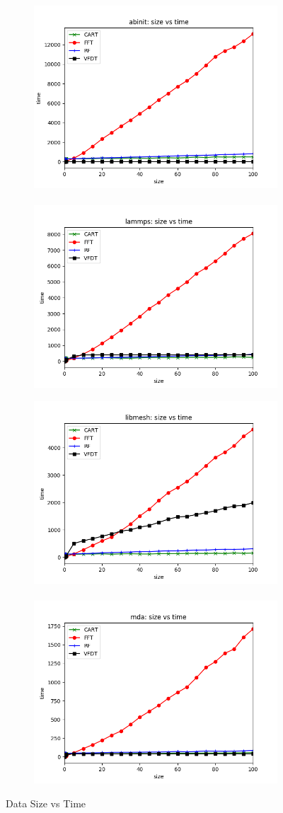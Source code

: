 \documentclass[sigplan]{acmart}\settopmatter{printfolios=true,printccs=false,printacmref=false}
\begin{document}
\begin{figure}
	\centering
	\begin{subfigure}[b]{\linewidth}
		\includegraphics[width=.49\linewidth]{fig/abinit-size-time.png} \ 
		\includegraphics[width=.49\linewidth]{fig/lammps-size-time.png}
	\end{subfigure}
	\begin{subfigure}[b]{\linewidth}
		\includegraphics[width=.49\linewidth]{fig/libmesh-size-time.png} \ 
		\includegraphics[width=.49\linewidth]{fig/mda-size-time.png}
	\end{subfigure}
	
	\caption{Data Size vs Time}\label{fig:time}
\end{figure}
\end{document}
